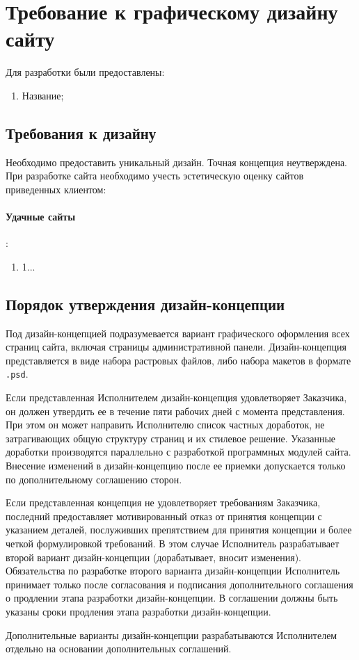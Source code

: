 \section{Требование к графическому дизайну сайту}
Для разработки были предоставлены:
\begin{enumerate}
  \item Название;
\end{enumerate}

\subsection{Требования к дизайну}
Необходимо предоставить уникальный дизайн. Точная концепция неутверждена.
При разработке сайта необходимо учесть эстетическую оценку сайтов приведенных клиентом:
\paragraph{Удачные сайты}:
\begin{enumerate}
  \item  1...
\end{enumerate}

\subsection{Порядок утверждения дизайн-концепции}
Под дизайн-концепцией подразумевается вариант графического оформления всех страниц сайта, включая страницы административной панели. Дизайн-концепция представляется в виде набора растровых файлов, либо набора макетов в формате \texttt{.psd}.

Если представленная Исполнителем дизайн-концепция удовлетворяет Заказчика, он должен утвердить ее в течение пяти рабочих дней с момента представления. При этом он может направить Исполнителю список частных доработок, не затрагивающих общую структуру страниц и их стилевое решение. Указанные доработки производятся параллельно с разработкой программных модулей сайта. Внесение изменений в дизайн-концепцию после ее приемки допускается только по дополнительному соглашению сторон.

Если представленная концепция не удовлетворяет требованиям Заказчика, последний предоставляет мотивированный отказ от принятия концепции с указанием деталей, послуживших препятствием для принятия концепции и более четкой формулировкой требований. В этом случае Исполнитель разрабатывает второй вариант дизайн-концепции (дорабатывает, вносит изменения). Обязательства по разработке второго варианта дизайн-концепции Исполнитель принимает только после согласования и подписания дополнительного соглашения о продлении этапа разработки дизайн-концепции. В соглашении должны быть указаны сроки продления этапа разработки дизайн-концепции.

Дополнительные варианты дизайн-концепции разрабатываются Исполнителем отдельно на основании дополнительных соглашений.
